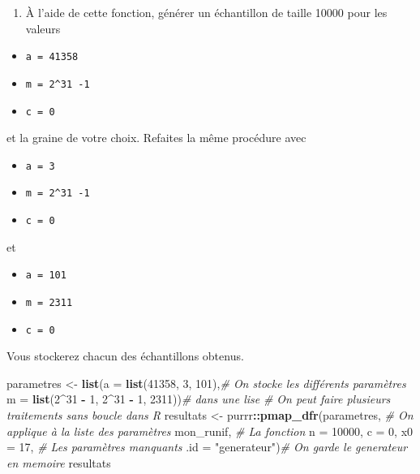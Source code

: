 \documentclass[]{article}
\newenvironment{Shaded}{\begin{snugshade}}{\end{snugshade}}
\newcommand{\CommentTok}[1]{\textcolor[rgb]{0.56,0.35,0.01}{\textit{#1}}}
\newcommand{\DataTypeTok}[1]{\textcolor[rgb]{0.13,0.29,0.53}{#1}}
\newcommand{\DecValTok}[1]{\textcolor[rgb]{0.00,0.00,0.81}{#1}}
\newcommand{\KeywordTok}[1]{\textcolor[rgb]{0.13,0.29,0.53}{\textbf{#1}}}
\newcommand{\NormalTok}[1]{#1}
\newcommand{\OperatorTok}[1]{\textcolor[rgb]{0.81,0.36,0.00}{\textbf{#1}}}
\newcommand{\StringTok}[1]{\textcolor[rgb]{0.31,0.60,0.02}{#1}}
\providecommand{\tightlist}{%
  \setlength{\itemsep}{0pt}\setlength{\parskip}{0pt}}
\begin{document}
\begin{enumerate}
\def\labelenumi{\arabic{enumi}.}
\setcounter{enumi}{1}
\tightlist
\item
  À l'aide de cette fonction, générer un échantillon de taille 10000
  pour les valeurs
\end{enumerate}

\begin{itemize}
\tightlist
\item
  \texttt{a\ =\ 41358}
\item
  \texttt{m\ =\ 2\^{}31\ -1}
\item
  \texttt{c\ =\ 0}
\end{itemize}

et la graine de votre choix. Refaites la même procédure avec

\begin{itemize}
\tightlist
\item
  \texttt{a\ =\ 3}
\item
  \texttt{m\ =\ 2\^{}31\ -1}
\item
  \texttt{c\ =\ 0}
\end{itemize}

et

\begin{itemize}
\tightlist
\item
  \texttt{a\ =\ 101}
\item
  \texttt{m\ =\ 2311}
\item
  \texttt{c\ =\ 0}
\end{itemize}

Vous stockerez chacun des échantillons obtenus.

\begin{Shaded}
\begin{Highlighting}[]
\NormalTok{parametres <-}\StringTok{ }\KeywordTok{list}\NormalTok{(}\DataTypeTok{a =} \KeywordTok{list}\NormalTok{(}\DecValTok{41358}\NormalTok{, }\DecValTok{3}\NormalTok{, }\DecValTok{101}\NormalTok{),}\CommentTok{# On stocke les différents paramètres}
                   \DataTypeTok{m =} \KeywordTok{list}\NormalTok{(}\DecValTok{2}\OperatorTok{^}\DecValTok{31} \OperatorTok{-}\StringTok{ }\DecValTok{1}\NormalTok{, }\DecValTok{2}\OperatorTok{^}\DecValTok{31} \OperatorTok{-}\StringTok{ }\DecValTok{1}\NormalTok{, }\DecValTok{2311}\NormalTok{))}\CommentTok{# dans une lise}
\CommentTok{# On peut faire plusieurs traitements sans boucle dans R}
\NormalTok{resultats <-}\StringTok{ }\NormalTok{purrr}\OperatorTok{::}\KeywordTok{pmap_dfr}\NormalTok{(parametres, }\CommentTok{# On applique à la liste des paramètres}
\NormalTok{                             mon_runif, }\CommentTok{# La fonction}
                             \DataTypeTok{n =} \DecValTok{10000}\NormalTok{, }\DataTypeTok{c =} \DecValTok{0}\NormalTok{, }\DataTypeTok{x0 =} \DecValTok{17}\NormalTok{, }\CommentTok{# Les paramètres manquants}
                             \DataTypeTok{.id =} \StringTok{"generateur"}\NormalTok{)}\CommentTok{# On garde le generateur en memoire}
\NormalTok{resultats}
\end{Highlighting}
\end{Shaded}
\end{document}
